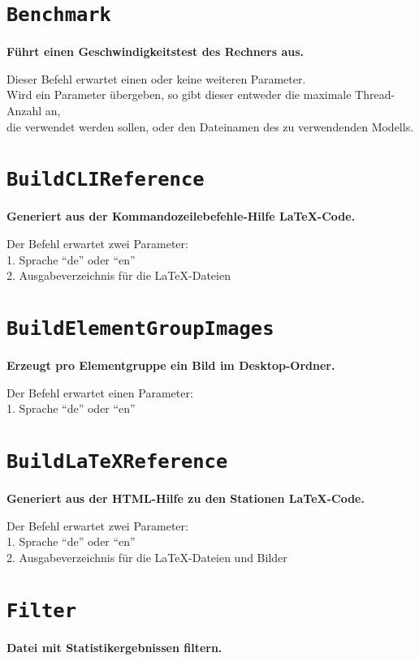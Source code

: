 \section{\texttt{Benchmark}}

\textbf{Führt einen Geschwindigkeitstest des Rechners aus.}

Dieser Befehl erwartet einen oder keine weiteren Parameter.\\
Wird ein Parameter übergeben, so gibt dieser entweder die maximale Thread-Anzahl an,\\
die verwendet werden sollen, oder den Dateinamen des zu verwendenden Modells.

\section{\texttt{BuildCLIReference}}

\textbf{Generiert aus der Kommandozeilebefehle-Hilfe LaTeX-Code.}

Der Befehl erwartet zwei Parameter:\\
1. Sprache "`de"' oder "`en"'\\
2. Ausgabeverzeichnis für die LaTeX-Dateien

\section{\texttt{BuildElementGroupImages}}

\textbf{Erzeugt pro Elementgruppe ein Bild im Desktop-Ordner.}

Der Befehl erwartet einen Parameter:\\
1. Sprache "`de"' oder "`en"'

\section{\texttt{BuildLaTeXReference}}

\textbf{Generiert aus der HTML-Hilfe zu den Stationen LaTeX-Code.}

Der Befehl erwartet zwei Parameter:\\
1. Sprache "`de"' oder "`en"'\\
2. Ausgabeverzeichnis für die LaTeX-Dateien und Bilder

\section{\texttt{Filter}}

\textbf{Datei mit Statistikergebnissen filtern.}

